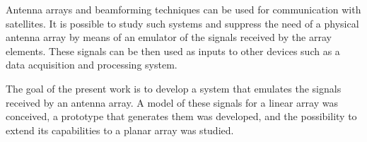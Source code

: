 \documentclass[class=article, crop=false]{standalone}
\begin{document}
Antenna arrays and beamforming techniques can be used for communication with satellites.
It is possible to study such systems and suppress the need of a physical antenna array by means of an emulator of the signals received by the array elements.
These signals can be then used as inputs to other devices such as a data acquisition and processing system.

The goal of the present work is to develop a system that emulates the signals received by an antenna array.
A model of these signals for a linear array was conceived, a prototype that generates them was developed, and the possibility to extend its capabilities to a planar array was studied.
\end{document}
